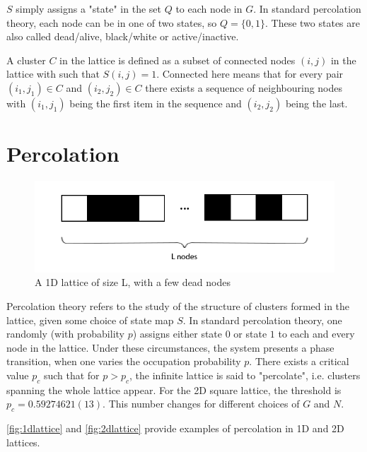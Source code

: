 $S$ simply assigns a "state" in the set $Q$ to each node in $G$. In standard percolation theory, each node can be in one of two states, so $Q = \{0, 1\}$. These two states are also called dead/alive, black/white or active/inactive.

A cluster $C$ in the lattice is defined as a subset of connected nodes $(i, j)$ in the lattice with such that $S(i, j) = 1$. Connected here means that for every pair $(i_1, j_1) \in C$ and $(i_2, j_2) \in C$ there exists a sequence of neighbouring nodes with $(i_1, j_1)$ being the first item in the sequence and $(i_2, j_2)$ being the last.



\section{Percolation}

\begin{figure}[h]
  \includegraphics[width=\linewidth]{Images/1dlattice.png}
  \caption{A 1D lattice of size L, with a few dead nodes}
  \label{fig:1dlattice}
\end{figure}




Percolation theory refers to the study of the structure of clusters formed in the lattice, given some choice of state map $S$. In standard percolation theory, one randomly (with probability $p$) assigns either state $0$ or state $1$ to each and every node in the lattice. Under these circumstances, the system presents a phase transition, when one varies the occupation probability $p$. There exists a critical value $p_c$ such that for $p > p_c$, the infinite lattice is said to "percolate", i.e. clusters spanning the whole lattice appear. For the 2D square lattice, the threshold is $p_c = 0.59274621(13)$. This number changes for different choices of $G$ and $N$.


\autoref{fig:1dlattice} and \autoref{fig:2dlattice} provide examples of percolation in 1D and 2D lattices.





